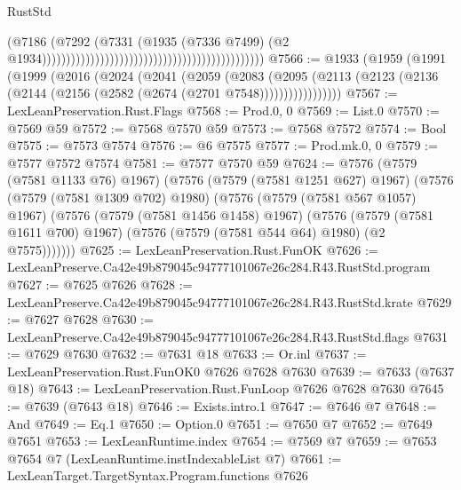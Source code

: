 \begin{lexlean}{RustStd}
\begin{coremodule}
                                                                                      (@7186
                                                                                        (@7292
                                                                                          (@7331
                                                                                            (@1935
                                                                                              (@7336
                                                                                                @7499)
                                                                                              (@2
                                                                                                @1934))))))))))))))))))))))))))))))))))))))))))))))
@7566 := @1933
    (@1959
      (@1991
        (@1999
          (@2016
            (@2024
              (@2041
                (@2059
                  (@2083
                    (@2095
                      (@2113 (@2123 (@2136 (@2144 (@2156 (@2582 (@2674 (@2701 @7548)))))))))))))))))
@7567 := LexLeanPreservation.Rust.Flags
@7568 := Prod.{0, 0}
@7569 := List.{0}
@7570 := @7569 @59
@7572 := @7568 @7570 @59
@7573 := @7568 @7572
@7574 := Bool
@7575 := @7573 @7574
@7576 := @6 @7575
@7577 := Prod.mk.{0, 0}
@7579 := @7577 @7572 @7574
@7581 := @7577 @7570 @59
@7624 := @7576
    (@7579 (@7581 @1133 @76) @1967)
    (@7576
      (@7579 (@7581 @1251 @627) @1967)
      (@7576
        (@7579 (@7581 @1309 @702) @1980)
        (@7576
          (@7579 (@7581 @567 @1057) @1967)
          (@7576
            (@7579 (@7581 @1456 @1458) @1967)
            (@7576
              (@7579 (@7581 @1611 @700) @1967)
              (@7576 (@7579 (@7581 @544 @64) @1980) (@2 @7575)))))))
@7625 := LexLeanPreservation.Rust.FunOK
@7626 := LexLeanPreserve.Ca42e49b879045c94777101067e26c284.R43.RustStd.program
@7627 := @7625 @7626
@7628 := LexLeanPreserve.Ca42e49b879045c94777101067e26c284.R43.RustStd.krate
@7629 := @7627 @7628
@7630 := LexLeanPreserve.Ca42e49b879045c94777101067e26c284.R43.RustStd.flags
@7631 := @7629 @7630
@7632 := @7631 @18
@7633 := Or.inl
@7637 := LexLeanPreservation.Rust.FunOK0 @7626 @7628 @7630
@7639 := @7633 (@7637 @18)
@7643 := LexLeanPreservation.Rust.FunLoop @7626 @7628 @7630
@7645 := @7639 (@7643 @18)
@7646 := Exists.intro.{1}
@7647 := @7646 @7
@7648 := And
@7649 := Eq.{1}
@7650 := Option.{0}
@7651 := @7650 @7
@7652 := @7649 @7651
@7653 := LexLeanRuntime.index
@7654 := @7569 @7
@7659 := @7653 @7654 @7 (LexLeanRuntime.instIndexableList @7)
@7661 := LexLeanTarget.TargetSyntax.Program.functions @7626

\end{coremodule}
\end{lexlean}
